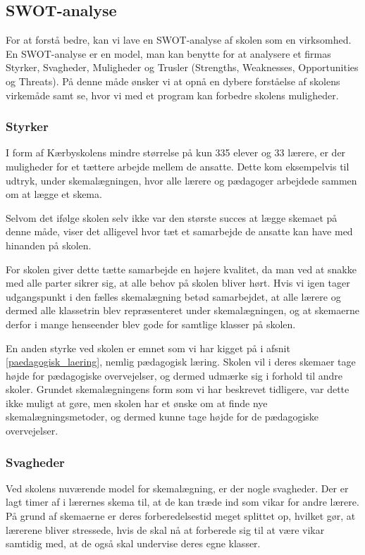 \subsection{SWOT-analyse}
For at forstå \school bedre, kan vi lave en SWOT-analyse af skolen som en virksomhed. En SWOT-analyse er en model, man kan benytte for at analysere et firmas Styrker, Svagheder, Muligheder og Trusler (Strengths, Weaknesses, Opportunities og Threats). På denne måde ønsker vi at opnå en dybere forståelse af skolens virkemåde samt se, hvor vi med et program kan forbedre skolens muligheder.

\subsubsection*{Styrker}
I form af Kærbyskolens mindre størrelse på kun 335 elever og 33 lærere\cite{Kaerbyskolens-laerere}, er der muligheder for et tættere arbejde mellem de ansatte. Dette kom eksempelvis til udtryk, under skemalægningen, hvor alle lærere og pædagoger arbejdede sammen om at lægge et skema.

Selvom det ifølge skolen selv ikke var den største succes at lægge skemaet på denne måde, viser det alligevel hvor tæt et samarbejde de ansatte kan have med hinanden på skolen.

For skolen giver dette tætte samarbejde en højere kvalitet, da man ved at snakke med alle parter sikrer sig, at alle behov på skolen bliver hørt. Hvis vi igen tager udgangspunkt i den fælles skemalægning betød samarbejdet, at alle lærere og dermed alle klassetrin blev repræsenteret under skemalægningen, og at skemaerne derfor i mange henseender blev gode for samtlige klasser på skolen. 

En anden styrke ved skolen er emnet som vi har kigget på i afsnit \ref{paedagogisk_laering}, nemlig pædagogisk læring. Skolen vil i deres skemaer tage højde for pædagogiske overvejelser, og dermed udmærke sig i forhold til andre skoler. Grundet skemalægningens form som vi har beskrevet tidligere, var dette ikke muligt at gøre, men skolen har et ønske om at finde nye skemalægningsmetoder, og dermed kunne tage højde for de pædagogiske overvejelser.

\subsubsection*{Svagheder}
Ved skolens nuværende model for skemalægning, er der nogle svagheder. Der er lagt timer af i lærernes skema til, at de kan træde ind som vikar for andre lærere. På grund af skemaerne er deres forberedelsestid meget splittet op, hvilket gør, at lærerene bliver stressede, hvis de skal nå at forberede sig til at være vikar samtidig med, at de også skal undervise deres egne klasser.

